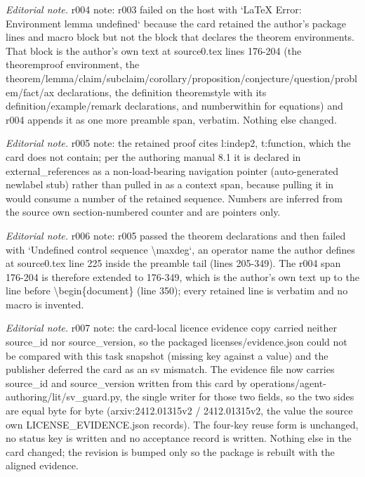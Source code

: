 \documentclass[10pt,a4paper]{article}
\theoremstyle{definition}
\numberwithin{equation}{section}
\begin{document}
\noindent\textit{Editorial note.} r004 note: r003 failed on the host with `LaTeX Error: Environment lemma undefined` because the card retained the author's package lines and macro block but not the block that declares the theorem environments. That block is the author's own text at source0.tex lines 176-204 (the theoremproof environment, the theorem/lemma/claim/subclaim/corollary/proposition/conjecture/question/problem/fact/ax declarations, the definition theoremstyle with its definition/example/remark declarations, and numberwithin for equations) and r004 appends it as one more preamble span, verbatim. Nothing else changed.\par\medskip
\noindent\textit{Editorial note.} r005 note: the retained proof cites l:indep2, t:function, which the card does not contain; per the authoring manual 8.1 it is declared in external\_references as a non-load-bearing navigation pointer (auto-generated newlabel stub) rather than pulled in as a context span, because pulling it in would consume a number of the retained sequence. Numbers are inferred from the source own section-numbered counter and are pointers only.\par\medskip
\noindent\textit{Editorial note.} r006 note: r005 passed the theorem declarations and then failed with `Undefined control sequence \textbackslash{}maxdeg`, an operator name the author defines at source0.tex line 225 inside the preamble tail (lines 205-349). The r004 span 176-204 is therefore extended to 176-349, which is the author's own text up to the line before \textbackslash{}begin\{document\} (line 350); every retained line is verbatim and no macro is invented.\par\medskip
\noindent\textit{Editorial note.} r007 note: the card-local licence evidence copy carried neither source\_id nor source\_version, so the packaged licenses/evidence.json could not be compared with this task snapshot (missing key against a value) and the publisher deferred the card as an sv mismatch. The evidence file now carries source\_id and source\_version written from this card by operations/agent-authoring/lit/sv\_guard.py, the single writer for those two fields, so the two sides are equal byte for byte (arxiv:2412.01315v2 / 2412.01315v2, the value the source own LICENSE\_EVIDENCE.json records). The four-key reuse form is unchanged, no status key is written and no acceptance record is written. Nothing else in the card changed; the revision is bumped only so the package is rebuilt with the aligned evidence.\par\medskip
\end{document}
